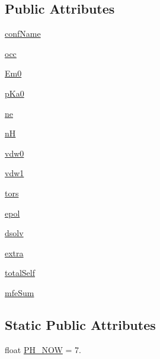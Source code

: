 \subsection*{Public Attributes}
\begin{DoxyCompactItemize}
\item 
\hyperlink{classoccupied__confs_1_1_conf_a13949303b665dcbe679ee6e7bc022d8f}{conf\-Name}
\item 
\hyperlink{classoccupied__confs_1_1_conf_a797d50d931016f337df10b3d813caea3}{occ}
\item 
\hyperlink{classoccupied__confs_1_1_conf_a97ff8bf981ee6cfc298743680892051e}{Em0}
\item 
\hyperlink{classoccupied__confs_1_1_conf_acce23ba752fb707934705e2388544cbc}{p\-Ka0}
\item 
\hyperlink{classoccupied__confs_1_1_conf_aa887cabafc23bbe447bc3d91155589ec}{ne}
\item 
\hyperlink{classoccupied__confs_1_1_conf_a835a97d72341cd881b12d52e9d651b09}{n\-H}
\item 
\hyperlink{classoccupied__confs_1_1_conf_ac5e8f69fab016810e30c0189140539f0}{vdw0}
\item 
\hyperlink{classoccupied__confs_1_1_conf_a959ce58c489f1b8a8bb9326af6e0b23b}{vdw1}
\item 
\hyperlink{classoccupied__confs_1_1_conf_ae2c305a0232855e7bd218be00667fb5a}{tors}
\item 
\hyperlink{classoccupied__confs_1_1_conf_a668d3ddba815ed7b3b6b98f88fa7291c}{epol}
\item 
\hyperlink{classoccupied__confs_1_1_conf_ac272b12f782bc678d77918617f6556ce}{dsolv}
\item 
\hyperlink{classoccupied__confs_1_1_conf_a7bbb6bae26eaf92f7c8c6d886c7f36e8}{extra}
\item 
\hyperlink{classoccupied__confs_1_1_conf_ad829e213e264e618aabce225db742550}{total\-Self}
\item 
\hyperlink{classoccupied__confs_1_1_conf_aab1f60df9bbea17a434edaf55153cec2}{mfe\-Sum}
\end{DoxyCompactItemize}
\subsection*{Static Public Attributes}
\begin{DoxyCompactItemize}
\item 
float \hyperlink{classoccupied__confs_1_1_conf_a6edc3ff9b93e79bce68057ef9a83dc86}{P\-H\-\_\-\-N\-O\-W} = 7.
\end{DoxyCompactItemize}


